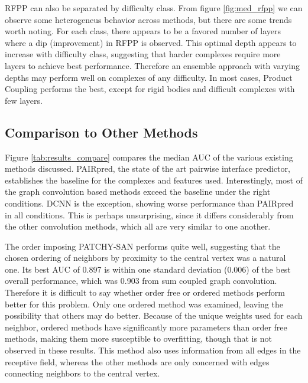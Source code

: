 RFPP can also be separated by difficulty class.
From figure \ref{fig:med_rfpp} we can observe some heterogeneus behavior across methods, but there are some trends worth noting.
For each class, there appears to be a favored number of layers where a dip (improvement) in RFPP is observed. 
This optimal depth appears to increase with difficulty class, suggesting that harder complexes require more layers to achieve best performance.
Therefore an ensemble approach with varying depths may perform well on complexes of any difficulty. 
In most cases, Product Coupling performs the best, except for rigid bodies and difficult complexes with few layers.



\subsection{Comparison to Other Methods}

Figure \ref{tab:results_compare} compares the median AUC of the various existing methods discussed.
PAIRpred, the state of the art pairwise interface predictor, establishes the baseline for the complexes and features used.
Interestingly, most of the graph convolution based methods exceed the baseline under the right conditions.
DCNN is the exception, showing worse performance than PAIRpred in all conditions.
This is perhaps unsurprising, since it differs considerably from the other convolution methods, which all are very similar to one another.

The order imposing PATCHY-SAN performs quite well, suggesting that the chosen ordering of neighbors by proximity to the central vertex was a natural one.
Its best AUC of 0.897 is within one standard deviation (0.006) of the best overall performance, which was 0.903 from sum coupled graph convolution.
Therefore it is difficult to say whether order free or ordered methods perform better for this problem.
Only one ordered method was examined, leaving the possibility that others may do better.
Because of the unique weights used for each neighbor, ordered methods have significantly more parameters than order free methods, making them more susceptible to overfitting, though that is not observed in these results.
This method also uses information from all edges in the receptive field, whereas the other methods are only concerned with edges connecting neighbors to the central vertex.

